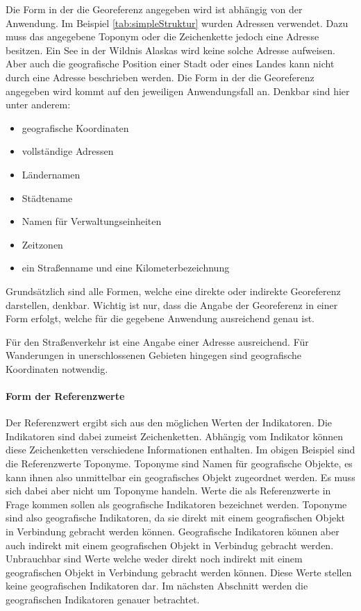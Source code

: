 				Die Form in der die Georeferenz angegeben wird ist abhängig von der Anwendung. 
				Im Beispiel \ref{tab:simpleStruktur} wurden Adressen verwendet. 
				Dazu muss das angegebene Toponym oder die Zeichenkette jedoch eine Adresse besitzen. 
				Ein See in der Wildnis Alaskas wird keine solche Adresse aufweisen.
				Aber auch die geografische Position einer Stadt oder eines Landes kann nicht durch eine Adresse beschrieben werden. 
				Die Form in der die Georeferenz angegeben wird kommt auf den jeweiligen Anwendungsfall an.
				Denkbar sind hier unter anderem:

				\begin{itemize}
				  	 \item geografische Koordinaten
				  	 \item vollständige Adressen
				  	 \item Ländernamen
				  	 \item Städtename
				  	 \item Namen für Verwaltungseinheiten 
				  	 \item Zeitzonen
				  	 \item ein Straßenname und eine Kilometerbezeichnung
				  \end{itemize}  

				  Grundsätzlich sind alle Formen, welche eine direkte oder indirekte Georeferenz darstellen, denkbar.
				  Wichtig ist nur, dass die Angabe der Georeferenz in einer Form erfolgt, welche für die gegebene Anwendung ausreichend genau ist.

				  Für den Straßenverkehr ist eine Angabe einer Adresse ausreichend.
				  Für Wanderungen in unerschlossenen Gebieten hingegen sind geografische Koordinaten notwendig. 

			\paragraph{Form der Referenzwerte}

				Der Referenzwert ergibt sich aus den möglichen Werten der Indikatoren.
				Die Indikatoren sind dabei zumeist Zeichenketten.
				Abhängig vom Indikator können diese Zeichenketten verschiedene Informationen enthalten.
				Im obigen Beispiel sind die Referenzwerte Toponyme.
				Toponyme sind Namen für geografische Objekte, es kann ihnen also unmittelbar ein geografisches Objekt zugeordnet werden.
				Es muss sich dabei aber nicht um Toponyme handeln.
				Werte die als Referenzwerte in Frage kommen sollen als geografische Indikatoren bezeichnet werden.
				Toponyme sind also geografische Indikatoren, da sie direkt mit einem geografischen Objekt in Verbindung gebracht werden können.
				Geografische Indikatoren können aber auch indirekt mit einem geografischen Objekt in Verbindug gebracht werden.
				Unbrauchbar sind Werte welche weder direkt noch indirekt mit einem geografischen Objekt in Verbindung gebracht werden können.
				Diese Werte stellen keine geografischen Indikatoren dar.
				Im nächsten Abschnitt werden die geografischen Indikatoren genauer betrachtet.

